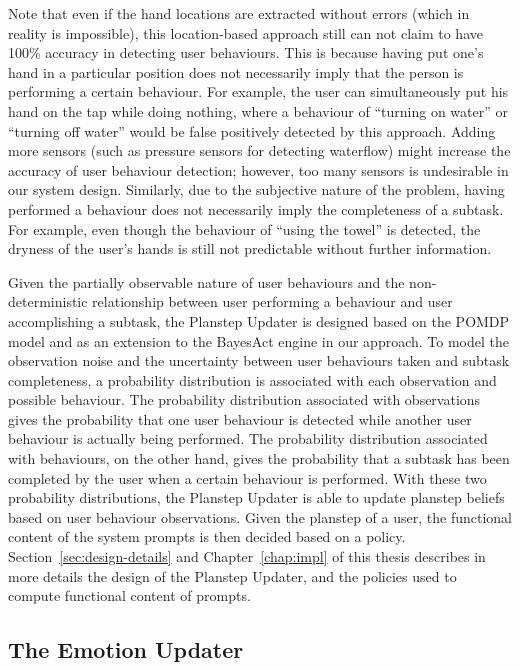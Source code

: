 Note that even if the hand locations are extracted without errors (which in reality is impossible), this location-based approach still can not claim to have 100\% accuracy in detecting user behaviours. This is because having put one's hand in a particular position does not necessarily imply that the person is performing a certain behaviour. For example, the user can simultaneously put his hand on the tap while doing nothing, where a behaviour of ``turning on water'' or ``turning off water'' would be false positively detected by this approach. Adding more sensors (such as pressure sensors for detecting waterflow) might increase the accuracy of user behaviour detection; however, too many sensors is undesirable in our system design. Similarly, due to the subjective nature of the problem, having performed a behaviour does not necessarily imply the completeness of a subtask. For example, even though the behaviour of ``using the towel'' is detected, the dryness of the user's hands is still not predictable without further information. 

Given the partially observable nature of user behaviours and the non-deterministic relationship between user performing a behaviour and user accomplishing a subtask, the Planstep Updater is designed based on the POMDP model and as an extension to the BayesAct engine \cite{hoey2013bayesian} in our approach. To model the observation noise and the uncertainty between user behaviours taken and subtask completeness, a probability distribution is associated with each observation and possible behaviour. The probability distribution associated with observations gives the probability that one user behaviour is detected while another user behaviour is actually being performed. The probability distribution associated with behaviours, on the other hand, gives the probability that a subtask has been completed by the user when a certain behaviour is performed. With these two probability distributions, the Planstep Updater is able to update planstep beliefs based on user behaviour observations. Given the planstep of a user, the functional content of the system prompts is then decided based on a policy. Section~\ref{sec:design-details} and Chapter~\ref{chap:impl} of this thesis describes in more details the design of the Planstep Updater, and the policies used to compute functional content of prompts.

\subsection{The Emotion Updater}


